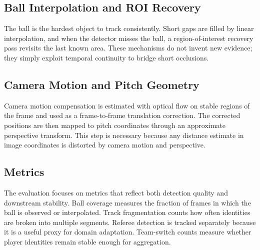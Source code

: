 \documentclass[11pt,a4paper]{article}
\begin{document}
\subsection{Ball Interpolation and ROI Recovery}
The ball is the hardest object to track consistently. Short gaps are filled by linear interpolation, and when the detector misses the ball, a region-of-interest recovery pass revisits the last known area. These mechanisms do not invent new evidence; they simply exploit temporal continuity to bridge short occlusions.

\subsection{Camera Motion and Pitch Geometry}
Camera motion compensation is estimated with optical flow on stable regions of the frame and used as a frame-to-frame translation correction. The corrected positions are then mapped to pitch coordinates through an approximate perspective transform. This step is necessary because any distance estimate in image coordinates is distorted by camera motion and perspective.

\subsection{Metrics}
The evaluation focuses on metrics that reflect both detection quality and downstream stability. Ball coverage measures the fraction of frames in which the ball is observed or interpolated. Track fragmentation counts how often identities are broken into multiple segments. Referee detection is tracked separately because it is a useful proxy for domain adaptation. Team-switch counts measure whether player identities remain stable enough for aggregation.

\begin{table}[H]
\centering
\caption{Metric families used in the analysis.}
\end{table}
\end{document}
